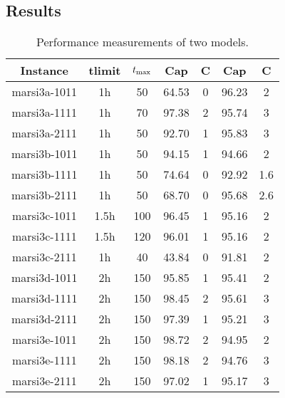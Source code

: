 \subsection{Results}
\begin{table}[h]
    \begin{center}
        \begin{tabular}{|c|c|c|c|c|c|c|}
            \hline
            Instance & tlimit & $t_{\max}$ & Cap & C & Cap & C\\
            \hline
            marsi3a-1011 & 1h & 50 & 64.53 & 0 & 96.23 & 2\\
            marsi3a-1111 & 1h & 70 & 97.38 & 2 & 95.74 & 3\\
            marsi3a-2111 & 1h & 50 & 92.70 & 1 & 95.83 & 3\\
            marsi3b-1011 & 1h & 50 & 94.15 & 1 & 94.66 & 2\\
            marsi3b-1111 & 1h & 50 & 74.64 & 0 & 92.92 & 1.6\\
            marsi3b-2111 & 1h & 50 & 68.70 & 0 & 95.68 & 2.6\\
            marsi3c-1011 & 1.5h & 100 & 96.45 & 1 & 95.16 & 2\\
            marsi3c-1111 & 1.5h & 120 & 96.01 & 1 & 95.16 & 2\\
            marsi3c-2111 & 1h & 40 & 43.84 & 0 & 91.81 & 2\\
            marsi3d-1011 & 2h & 150 & 95.85 & 1 & 95.41 & 2\\
            marsi3d-1111 & 2h & 150 & 98.45 & 2 & 95.61 & 3\\
            marsi3d-2111 & 2h & 150 & 97.39 & 1 & 95.21 & 3\\
            marsi3e-1011 & 2h & 150 & 98.72 & 2 & 94.95 & 2\\
            marsi3e-1111 & 2h & 150 & 98.18 & 2 & 94.76 & 3\\
            marsi3e-2111 & 2h & 150 & 97.02 & 1 & 95.17 & 3\\
            \hline
        \end{tabular}
        \caption{Performance measurements of two models.}
        \label{tbl:compare}
    \end{center}
\end{table}
